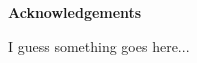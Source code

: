 %
%
%


\begin{alwayssingle} 
    \thispagestyle{empty}
    \begin{center}
        \vspace*{1.5cm}
        {\Large \bfseries Acknowledgements}
    \end{center}
    \vspace{0.5cm}
    I guess something goes here...
\end{alwayssingle}
